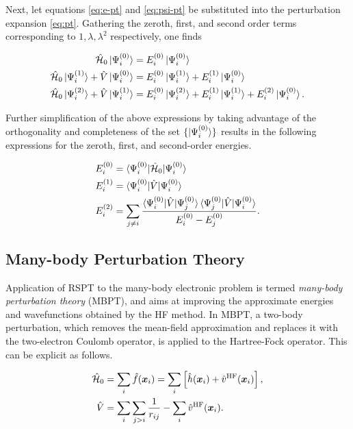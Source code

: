 Next, let equations \ref{eq:e-pt} and \ref{eq:psi-pt} be substituted into the
perturbation expansion \ref{eq:pt}. Gathering the zeroth, first, and second
order terms corresponding to $1, \lambda, \lambda^2$ respectively, one finds

\begin{align}
	\hat{\mathcal{H}}_0 \ket{\Psi_{i}^{(0)}} &= E^{(0)}_{i} \ket{\Psi_{i}^{(0)}} \\
	\hat{\mathcal{H}}_0 \ket{\Psi_{i}^{(1)}} + \hat V \ket{\Psi_{i}^{(0)}}
				&= E^{(0)}_{i} \ket{\Psi_{i}^{(1)}} + E^{(1)}_{i} \ket{\Psi_{i}^{(0)}} \\
	\hat{\mathcal{H}}_0 \ket{\Psi_{i}^{(2)}} + \hat V \ket{\Psi_{i}^{(1)}}
				&= E^{(0)}_{i} \ket{\Psi_{i}^{(2)}} + E^{(1)}_{i} \ket{\Psi_{i}^{(1)}} + E^{(2)}_{i} \ket{\Psi_{i}^{(0)}}.
\end{align}

Further simplification of the above expressions by taking advantage of the
orthogonality and completeness of the set $\{\ket{\Psi_{i}^{(0)}}\}$ results in the
following expressions for the zeroth, first, and second-order energies.

\begin{align}
	\perturbE{0} &= \braket{\Psi_i^{(0)} | \hamil_0 | \Psi_i^{(0)}} \\
	\perturbE{1} &= \braket{\Psi_i^{(0)} | \hat V | \Psi_i^{(0)}} \\
	\label{eq:rspt-2}
	\perturbE{2} &= \sum_{j \neq i}
	\frac{\braket{\Psi_i^{(0)} | \hat V | \Psi_j^{(0)}} \braket{\Psi_j^{(0)} | \hat V | \Psi_i^{(0)}}}
	{\perturbE[i]{0} - \perturbE[j]{0}}.
\end{align}

\subsection{Many-body Perturbation Theory}

Application of RSPT to the many-body electronic problem is termed
\emph{many-body perturbation theory} (MBPT), and aims at improving the
approximate energies and wavefunctions obtained by the HF method. In MBPT, a
two-body perturbation, which removes the mean-field approximation and replaces
it with the two-electron Coulomb operator, is applied to the Hartree-Fock
operator. This can be explicit as follows.

\begin{align}
	\hat{\mathcal{H}}_0 &=  \sum_i \hat f(\bm x_i) = \sum_i \left[ \hat h(\bm x_i) + \hat v^\text{HF}(\bm x_i) \right], \\
	\hat V &= \sum_i \sum_{j > i} \frac{1}{r_{ij}} - \sum_i \hat v^\text{HF}(\bm x_i).
\end{align}

